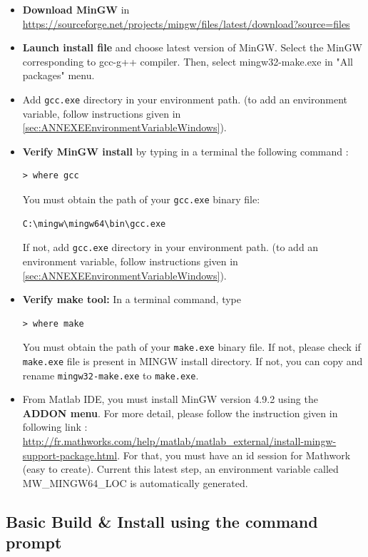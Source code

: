 \begin{itemize}
\item \textbf{Download MinGW} in \url{https://sourceforge.net/projects/mingw/files/latest/download?source=files}
\item \textbf{Launch install file} and choose latest version of MinGW. Select the MinGW corresponding to gcc-g++ compiler. Then, select mingw32-make.exe in "All packages" menu. 
\item Add \texttt{gcc.exe} directory in your environment path. 
(to add an environment variable, follow instructions given in \ref{sec:ANNEXEEnvironmentVariableWindows}). 
\item \textbf{Verify MinGW install} by typing in a terminal the following command : 
\begin{lstlisting}
> where gcc
\end{lstlisting}
You must obtain the path of your \texttt{gcc.exe} binary file: 
\begin{lstlisting}[backgroundcolor=\color{white}]
C:\mingw\mingw64\bin\gcc.exe
\end{lstlisting}
If not, add \texttt{gcc.exe} directory in your environment path. 
(to add an environment variable, follow instructions given in \ref{sec:ANNEXEEnvironmentVariableWindows}). 

\item \textbf{Verify make tool:} In a terminal command, type
\begin{lstlisting}
> where make
\end{lstlisting}
You must obtain the path of your \texttt{make.exe} binary file. 
If not, please check if \texttt{make.exe} file is present in MINGW install directory. If not, you can copy and rename \texttt{mingw32-make.exe} to \texttt{make.exe}.

\item From Matlab IDE, you must install MinGW version 4.9.2 using the \textbf{ADDON menu}. For more detail, please follow the instruction given in following link :  
\url{http://fr.mathworks.com/help/matlab/matlab_external/install-mingw-support-package.html}. For that, you must have an id session for Mathwork (easy to create). Current this latest step, an environment variable called MW\_MINGW64\_LOC is automatically generated. 
\end{itemize}


\subsection{Basic Build \& Install using the command prompt}
\label{sec:WinMinGWBasicInstall}

